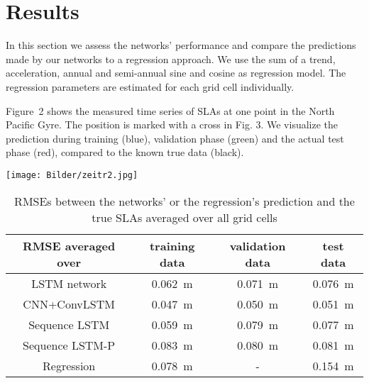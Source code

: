 \documentclass{article}
\begin{document}
\section{Results}
\label{sec:majhead}


In this section we assess the networks' performance and compare the predictions made by our networks to a regression approach. We use the sum of a trend, acceleration, annual and semi-annual sine and cosine as regression model. The regression parameters are estimated for each grid cell individually.

Figure~2 shows the measured time series of SLAs at one point in the North Pacific Gyre.
The position is marked with a cross in Fig. 3.
We visualize the prediction during training (blue), validation phase (green) and the actual test phase (red), compared to the known true data (black).

\vspace{0.6cm}

\hspace{-0.65cm}
\begin{minipage}[t!]{0.45\textwidth}
\begin{center}
	\texttt{[image: Bilder/zeitr2.jpg]}
	\vspace{-0.2cm}
\end{center}
\end{minipage}



\setlength{\belowrulesep}{0pt}
\hspace{-0.6cm}
\begin{table}
{\fontsize{8.5}{10} \selectfont
\begin{tabular}{|c|c|c|c|}
\hline
RMSE averaged over & training data & validation data & test data \\
\toprule[1pt]
LSTM network & 0.062~m & 0.071~m & 0.076~m \\
\hline
CNN+ConvLSTM & 0.047~m & 0.050~m & 0.051~m \\
\hline
Sequence LSTM & 0.059~m & 0.079~m & 0.077~m \\
\hline
Sequence LSTM-P & 0.083~m & 0.080~m & 0.081~m \\
\hline
Regression & 0.078~m & - & 0.154~m \\
\hline
\end{tabular}
}
\vspace{-0.35cm}
\caption{RMSEs between the networks' or the regression's prediction and the true SLAs averaged over all grid cells}
\end{table}
\end{document}
